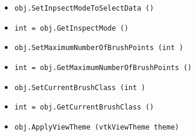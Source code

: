 \begin{itemize}
\item  \verb|obj.SetInpsectModeToSelectData ()|

\item  \verb|int = obj.GetInspectMode ()|

\item  \verb|obj.SetMaximumNumberOfBrushPoints (int )|

\item  \verb|int = obj.GetMaximumNumberOfBrushPoints ()|

\item  \verb|obj.SetCurrentBrushClass (int )|

\item  \verb|int = obj.GetCurrentBrushClass ()|

\item  \verb|obj.ApplyViewTheme (vtkViewTheme theme)|

\end{itemize}
